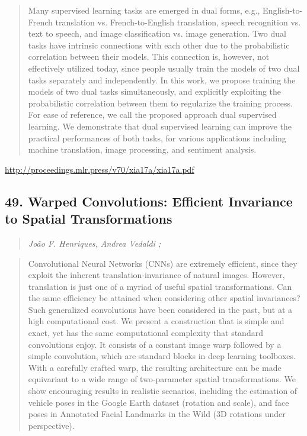 \documentclass{article}
\begin{document}
\begin{quote}
    Many supervised learning tasks are emerged in dual forms, e.g., English-to-French translation vs. French-to-English translation, speech recognition vs. text to speech, and image classification vs. image generation. Two dual tasks have intrinsic connections with each other due to the probabilistic correlation between their models. This connection is, however, not effectively utilized today, since people usually train the models of two dual tasks separately and independently. In this work, we propose training the models of two dual tasks simultaneously, and explicitly exploiting the probabilistic correlation between them to regularize the training process. For ease of reference, we call the proposed approach dual supervised learning. We demonstrate that dual supervised learning can improve the practical performances of both tasks, for various applications including machine translation, image processing, and sentiment analysis.  \end{quote}

\href{http://proceedings.mlr.press/v70/xia17a/xia17a.pdf}{http://proceedings.mlr.press/v70/xia17a/xia17a.pdf}

\subsection{49. Warped Convolutions: Efficient Invariance to Spatial Transformations}

\begin{quote}
\footnotesize{\textit{João F. Henriques, Andrea Vedaldi ;}}
\end{quote}

\begin{quote}
    Convolutional Neural Networks (CNNs) are extremely efficient, since they exploit the inherent translation-invariance of natural images. However, translation is just one of a myriad of useful spatial transformations. Can the same efficiency be attained when considering other spatial invariances? Such generalized convolutions have been considered in the past, but at a high computational cost. We present a construction that is simple and exact, yet has the same computational complexity that standard convolutions enjoy. It consists of a constant image warp followed by a simple convolution, which are standard blocks in deep learning toolboxes. With a carefully crafted warp, the resulting architecture can be made equivariant to a wide range of two-parameter spatial transformations. We show encouraging results in realistic scenarios, including the estimation of vehicle poses in the Google Earth dataset (rotation and scale), and face poses in Annotated Facial Landmarks in the Wild (3D rotations under perspective).  \end{quote}
\end{document}
